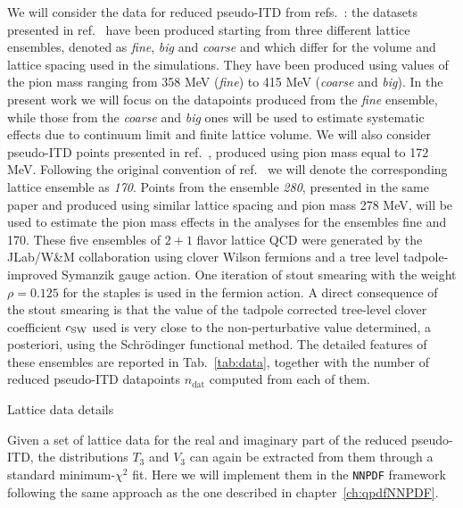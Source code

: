 %
We will consider the data for reduced pseudo-ITD from refs.~\cite{Joo:2019jct, Joo:2020spy}:
the datasets presented in ref.~\cite{Joo:2019jct} have been produced starting from three different lattice 
ensembles, denoted as \textit{fine}, \textit{big} and \textit{coarse} and which differ for the volume and lattice spacing 
used in the simulations. They have been produced using values of the pion mass ranging from 358 MeV (\textit{fine})
to 415 MeV (\textit{coarse} and \textit{big}). 
In the present work we will focus on the datapoints produced from the \textit{fine} ensemble, 
while those from the \textit{coarse} and \textit{big} ones will be used to estimate systematic effects due to continuum limit 
and finite lattice volume.
We will also consider pseudo-ITD points presented in ref.~\cite{Joo:2020spy}, produced using pion mass equal to 172 MeV.
Following the original convention of ref.~\cite{Joo:2020spy} we will denote the corresponding lattice ensemble as \textit{170}.
Points from the ensemble \textit{280}, presented in the same paper and produced using similar lattice spacing and pion mass 278 MeV,
will be used to estimate the pion mass effects in the analyses for the ensembles fine and 170.
%
These five ensembles of $2+1$ flavor lattice QCD were generated by the JLab/W\&M collaboration using clover Wilson fermions 
and a tree level tadpole-improved Symanzik gauge action. One iteration of stout smearing with the weight $ \rho = 0.125$ 
for the staples is used in the fermion action. 
A direct consequence of the stout smearing is that the value of the tadpole corrected tree-level clover coefficient $c_{\rm SW}$ 
used is very close to the non-perturbative value determined, a posteriori, using the Schr\"odinger functional method.
The detailed features of these ensembles are reported in Tab.~\ref{tab:data},
together with the number of reduced pseudo-ITD datapoints $n_{\text{dat}}$ computed from each of them.
\begin{table}[t]
	\renewcommand*{\arraystretch}{1.60}
	\scriptsize
	\centering
	
	\vspace{0.3cm}
	\caption{Lattice data details}
	\label{tab:data}
\end{table}

Given a set of lattice data for the real and imaginary part of the reduced pseudo-ITD, 
the distributions $T_3$ and $V_3$ can again be extracted from them through a standard minimum-$\chi^2$ fit.
Here we will implement them in the {\tt NNPDF} framework following the same approach as the one
described in chapter~\ref{ch:qpdfNNPDF}.


